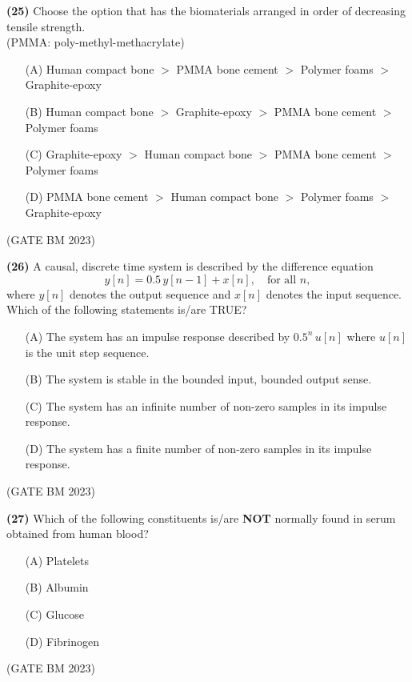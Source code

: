 \documentclass[journal]{IEEEtran}
\numberwithin{equation}{enumi}
\numberwithin{figure}{enumi}
\begin{document}
\textbf{(25)} Choose the option that has the biomaterials arranged in order of decreasing tensile strength.\\

(PMMA: poly-methyl-methacrylate)

\begin{enumerate}
    \item[(A)] Human compact bone $>$ PMMA bone cement $>$ Polymer foams $>$ Graphite-epoxy
    \item[(B)] Human compact bone $>$ Graphite-epoxy $>$ PMMA bone cement $>$ Polymer foams
    \item[(C)] Graphite-epoxy $>$ Human compact bone $>$ PMMA bone cement $>$ Polymer foams
    \item[(D)] PMMA bone cement $>$ Human compact bone $>$ Polymer foams $>$ Graphite-epoxy
\end{enumerate}
\hfill (GATE BM 2023)

\textbf{(26)} A causal, discrete time system is described by the difference equation
\[
y[n] = 0.5 \, y[n - 1] + x[n], \quad \text{for all } n,
\]
where \( y[n] \) denotes the output sequence and \( x[n] \) denotes the input sequence.\\
Which of the following statements is/are TRUE?

\begin{enumerate}
    \item[(A)] The system has an impulse response described by \( 0.5^n \, u[n] \) where \( u[n] \) is the unit step sequence.
    \item[(B)] The system is stable in the bounded input, bounded output sense.
    \item[(C)] The system has an infinite number of non-zero samples in its impulse response.
    \item[(D)] The system has a finite number of non-zero samples in its impulse response.
\end{enumerate}
\hfill (GATE BM 2023)

\textbf{(27)} Which of the following constituents is/are \textbf{NOT} normally found in serum obtained from human blood?

\begin{enumerate}
    \item[(A)] Platelets
    \item[(B)] Albumin
    \item[(C)] Glucose
    \item[(D)] Fibrinogen
\end{enumerate}
\hfill (GATE BM 2023)
\end{document}
